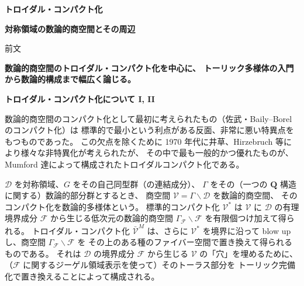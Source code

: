 \documentclass[uplatex,dvipdfmx]{jlreq}
\begin{document}
\begin{center}
  \vspace*{20pt}
  {\Huge\bfseries トロイダル・コンパクト化}

  \vspace{30pt}

  {\Large\bfseries 対称領域の数論的商空間とその周辺}

  \vspace{50pt}

  {\large 前文}

  \vspace{10pt}

  \parbox{0.85\textwidth}{
    \large\bfseries
    数論的商空間のトロイダル・コンパクト化を中心に、
    トーリック多様体の入門から数論的構成まで幅広く論じる。
  }
\end{center}

\vfill

\newpage

\noindent
{\large\bfseries トロイダル・コンパクト化について I, II}

\medskip
\hspace*{\fill}{\large\bfseries 佐武 一郎（中央大学・理工）}

\bigskip\bigskip

数論的商空間のコンパクト化として最初に考えられたもの（佐武・Baily--Borel のコンパクト化）は
標準的で最小という利点がある反面、非常に悪い特異点をもつものであった。
この欠点を除くために 1970 年代に井草、Hirzebruch 等により様々な非特異化が考えられたが、
その中で最も一般的かつ優れたものが、Mumford 達によって構成されたトロイダルコンパクト化である。

$\mathcal{D}$ を対称領域、$G$ をその自己同型群（の連結成分）、
$\Gamma$ をその（一つの $\mathbf{Q}$ 構造に関する）数論的部分群とするとき、
商空間 $\mathcal{V} = \Gamma \backslash \mathcal{D}$ を数論的商空間、
そのコンパクト化を数論的多様体という。
標準的コンパクト化 $\mathcal{V}^{\ast}$ は $\mathcal{V}$ に
$\mathcal{D}$ の有理境界成分 $\mathcal{F}$ から生じる低次元の数論的商空間
$\Gamma_{\mathcal{F}} \backslash \mathcal{F}$ を有限個つけ加えて得られる。
トロイダル・コンパクト化 $\bar{\mathcal{V}}^M$ は、さらに $\mathcal{V}^{\ast}$ を境界に沿って
blow up し、商空間 $\Gamma_{\mathcal{F}} \backslash \mathcal{F}$ を
その上のある種のファイバー空間で置き換えて得られるものである。
それは $\mathcal{D}$ の境界成分 $\mathcal{F}$ から生じる $\mathcal{V}$ の「穴」を埋めるために、
（$\mathcal{F}$ に関するジーゲル領域表示を使って）そのトーラス部分を
トーリック完備化で置き換えることによって構成される。
\end{document}
